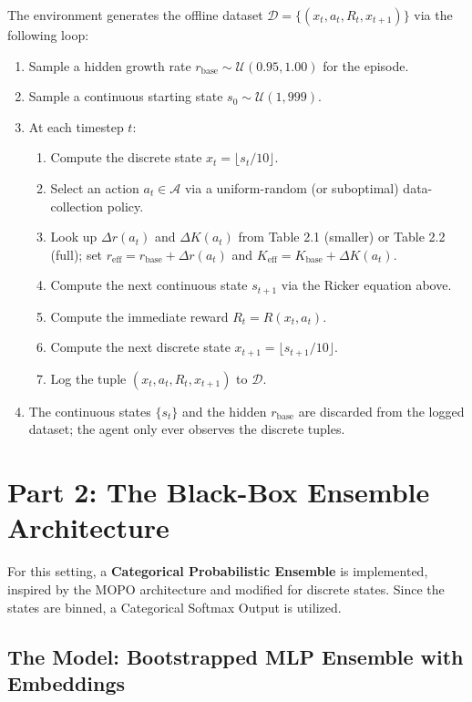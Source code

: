 \documentclass[11pt]{article}
\begin{document}
The environment generates the offline dataset $\mathcal{D} = \{(x_t, a_t, R_t, x_{t+1})\}$ via the following loop:
\begin{enumerate}
    \item Sample a hidden growth rate $r_{\mathrm{base}} \sim \mathcal{U}(0.95, 1.00)$ for the episode.
    \item Sample a continuous starting state $s_0 \sim \mathcal{U}(1, 999)$.
    \item At each timestep $t$:
    \begin{enumerate}
        \item Compute the discrete state $x_t = \lfloor s_t / 10 \rfloor$.
        \item Select an action $a_t \in \mathcal{A}$ via a uniform-random (or suboptimal) data-collection policy.
        \item Look up $\Delta r(a_t)$ and $\Delta K(a_t)$ from Table 2.1 (smaller) or Table 2.2 (full); set $r_{\mathrm{eff}} = r_{\mathrm{base}} + \Delta r(a_t)$ and $K_{\mathrm{eff}} = K_{\mathrm{base}} + \Delta K(a_t)$.
        \item Compute the next continuous state $s_{t+1}$ via the Ricker equation above.
        \item Compute the immediate reward $R_t = R(x_t, a_t)$.
        \item Compute the next discrete state $x_{t+1} = \lfloor s_{t+1} / 10 \rfloor$.
        \item Log the tuple $(x_t, a_t, R_t, x_{t+1})$ to $\mathcal{D}$.
    \end{enumerate}
    \item The continuous states $\{s_t\}$ and the hidden $r_{\mathrm{base}}$ are discarded from the logged dataset; the agent only ever observes the discrete tuples.
\end{enumerate}

\newpage

\section*{Part 2: The Black-Box Ensemble Architecture}

For this setting, a \textbf{Categorical Probabilistic Ensemble} is implemented, inspired by the MOPO architecture and modified for discrete states. Since the states are binned, a Categorical Softmax Output is utilized.

\subsection*{The Model: Bootstrapped MLP Ensemble with Embeddings}
\end{document}
